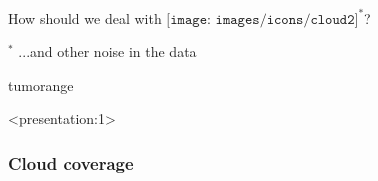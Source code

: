 
{{
\begin{frame}[plain]
\end{frame}
}

{
	\begin{frame}[plain]
			
		
			
	\end{frame}
	
}

{
	\begin{frame}[plain]
	
	\vspace{8em}
	\begin{center}
		\Huge\color{tumwhite}
		How should we deal with $\texttt{[image: images/icons/cloud2]}^\ast$?
	\end{center}\color{white}
	\vspace{2em}
	\raggedleft \Large$^\ast$ ...and other noise in the data
	
	\vfill
	\vspace{6em}
\end{frame}
}tumorange


\begin{frame}<presentation:1>
\frametitle{Cloud coverage}
\centering

\def\imagewidth{1.5cm}



\end{frame}}
